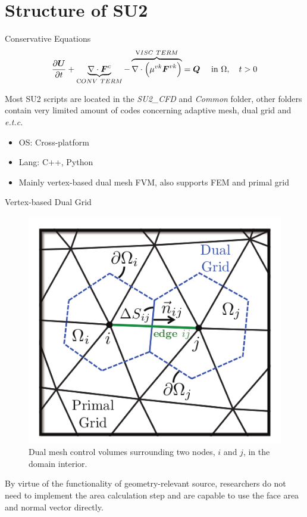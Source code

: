 \section{Structure of SU2}

\begin{frame}{Conservative Equations}
\begin{equation}
\frac{\partial \boldsymbol{U}}{\partial t}+\underbrace{\nabla \cdot \boldsymbol{F}^{c}}_{\text CONV\ TERM}-\overbrace{\nabla \cdot\left(\mu^{v k} \boldsymbol{F}^{v k}\right)}^{\text VISC\ TERM}=\boldsymbol{Q} \quad \text { in }\Omega,  \quad t>0
\end{equation}

Most SU2 scripts are located in the \textit{SU2\_CFD} and \textit{Common} folder, other folders contain very limited amount of codes concerning adaptive mesh, dual grid and \textit{e.t.c.} 

\begin{itemize}
    \item OS: Cross-platform
    \item Lang: C++, Python
    \item Mainly vertex-based dual mesh FVM, also supports FEM and primal grid
\end{itemize}
\end{frame}

\begin{frame}{Vertex-based Dual Grid}
\begin{figure}
    \centering
    \includegraphics[width=0.5\linewidth]{figures/DualMeshControlVolume.png}
    \caption{Dual mesh control volumes surrounding two nodes, $i$ and $j$, in the domain interior.}
\end{figure}


By virtue of the functionality of geometry-relevant source, researchers do not need to implement the area calculation step and are capable to use the face area and normal vector directly.

\end{frame}

